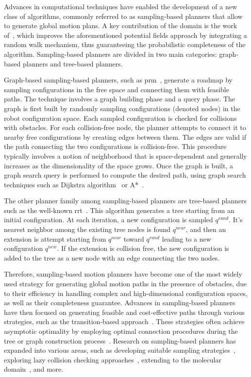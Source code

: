 Advances in computational techniques have enabled the development of a new class of algorithms, commonly referred to as sampling-based planners that allow to generate global motion plans.
A key contribution of the domain is the work of~\cite{cLatombe}, which improves the aforementioned potential fields approach by integrating a random walk mechanism, thus guaranteeing the probabilistic completeness of the algorithm.
Sampling-based planners are divided in two main categories: graph-based planners and tree-based planners.

Graph-based sampling-based planners, such as \gls{prm}~\cite{cPRM}, generate a roadmap by sampling configurations in the free space and connecting them with feasible paths. 
The technique involves a graph building phase and a query phase.
The graph is first built by randomly sampling configurations (denoted nodes) in the robot configuration space.
Each sampled configuration is checked for collisions with obstacles.
For each collision-free node, the planner attempts to connect it to nearby free configurations by creating edges between them.  
The edges are valid if the path connecting the two configurations is collision-free.
This procedure typically involves a notion of neighborhood that is space-dependent and generally increases as the dimensionality of the space grows.
Once the graph is built, a graph search query is performed to compute the desired path, using graph search techniques such as Dijkstra algorithm~\cite{cDijk} or A*~\cite{cA*}.

The other planner family among sampling-based planners are tree-based planners such as the well-known \gls{rrt}~\cite{cRRT}.
This algorithm generates a tree starting from an initial configuration.
At each iteration, a new configuration is sampled $q^{rand}$.
It's nearest neighbor among the existing tree nodes is found $q^{near}$, and then an extension is attempt starting from $q^{near}$ toward $q^{rand}$ leading to a new configuration $q^{new}$.
If the extension is collision free, the new configuration is added to the tree as a new node with an edge connecting the two nodes.

Therefore, sampling-based motion planners have become one of the most widely used strategy for generating global motion paths in the presence of obstacles, due to their efficiency in handling complex and high-dimensional configuration spaces, as well as their completeness guarantee.
Advances in sampling-based planners have then focused on generating feasible and cost-effective paths through various strategies, such as the transition-based approach~\cite{cTRRT}. 
These strategies often achieve asymptotic optimality by employing optimal connection procedures during the tree or graph construction process~\cite{cRRTstar, cTRRTstar, cFMT}.
Research on sampling-based planners has expanded into various areas, such as developing suitable sampling strategies~\cite{cSampling}, exploring lazy collision checking approaches~\cite{cLazy1}, extending to the molecular domain~\cite{cMolecular}, and more.

